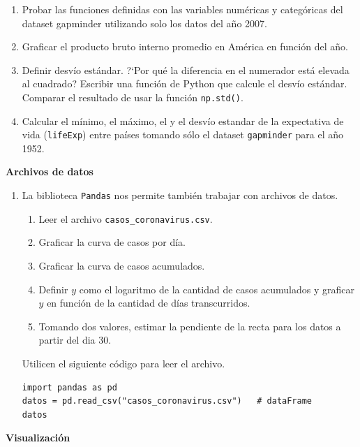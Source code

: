 \documentclass[a4paper,11pt]{article}
\theoremstyle{definition}
\begin{document}
\begin{enumerate}[resume]
\item Probar las funciones definidas con las variables numéricas y categóricas del dataset gapminder utilizando solo los datos del año 2007.

\item Graficar el producto bruto interno promedio en América en función del año.

\item Definir desv\'io est\'andar. ?`Por qu\'e la diferencia en el numerador est\'a elevada al cuadrado? Escribir una funci\'on de Python que calcule el desv\'io est\'andar. Comparar el resultado de usar la funci\'on \lstinline{np.std()}.

\item Calcular el mínimo, el máximo, el y el desv\'io estandar de la expectativa de vida (\lstinline{lifeExp}) entre pa\'ises tomando s\'olo el dataset \lstinline{gapminder} para el a\~no 1952.
\end{enumerate}

\textbf{\large Archivos de datos}

\begin{enumerate}[resume]
\item La biblioteca \lstinline{Pandas} nos permite tambi\'en trabajar con archivos de datos.

\begin{enumerate}
\item Leer el archivo \lstinline{casos_coronavirus.csv}.
\item Graficar la curva de casos por d\'ia.
\item Graficar la curva de casos acumulados.
\item Definir $y$ como el logaritmo de la cantidad de casos acumulados y graficar $y$ en funci\'on de la cantidad de d\'ias transcurridos.
\item Tomando dos valores, estimar la pendiente de la recta para los datos a partir del dia 30.
\end{enumerate}

Utilicen el siguiente c\'odigo para leer el archivo.

\begin{lstlisting}
import pandas as pd
datos = pd.read_csv("casos_coronavirus.csv")   # dataFrame
datos
\end{lstlisting}

\end{enumerate}

\textbf{\large Visualizaci\'on}
\end{document}

